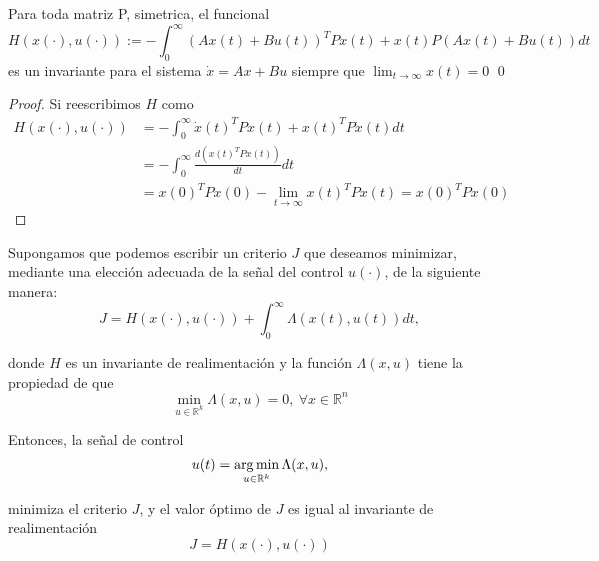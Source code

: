 \begin{lemma}
Para toda matriz P, simetrica, el funcional
\begin{equation*}
H\left(x(\cdot),u(\cdot)\right):=-\int_0^{\infty}\left(Ax(t)+Bu(t)\right)^TPx(t)+x(t)P\left(Ax(t)+Bu(t)\right)dt
\end{equation*}
es un invariante para el sistema $\dot{x} = Ax+Bu$ siempre que $\lim_{t\rightarrow \infty} x(t)= 0$
\qed
\end{lemma}
\begin{proof}
Si reescribimos $H$ como
\begin{equation*}
\begin{split}
H\left(x(\cdot),u(\cdot)\right) &= -\int_0^{\infty}\dot{x}(t)^TPx(t)+x(t)^TP\dot{x}(t)dt\\
&= -\int_0^{\infty}\frac{d\left(x(t)^TPx(t)\right)}{dt}dt\\
&=x(0)^TPx(0) -\lim_{t\rightarrow \infty} x(t)^TPx(t) = x(0)^TPx(0)
\end{split}
\end{equation*}
\end{proof}

Supongamos que podemos escribir un criterio $J$ que deseamos minimizar, mediante una elección adecuada de la señal del control $u(\cdot)$, de la siguiente manera:
\begin{equation}
J = H\left(x(\cdot),u(\cdot)\right) + \int_0^{\infty} \Lambda \left(x(t),u(t)\right)dt,
\end{equation}

donde $H$ es un invariante de realimentación y la función $\Lambda(x,u)$ tiene la propiedad de que
\begin{equation*}
\min_{u \in \mathbb{R}^k} \Lambda(x,u) = 0,\ \forall x \in \mathbb{R}^n
\end{equation*}

Entonces, la señal de control
\begin{equation*}
u(t) = \argmin_{u \in \mathbb{R}^k} \Lambda (x,u),
\end{equation*}

minimiza el criterio $J$, y el valor óptimo de $J$ es igual al invariante de realimentación
\begin{equation*}
J = H\left(x(\cdot),u(\cdot)\right)
\end{equation*}

